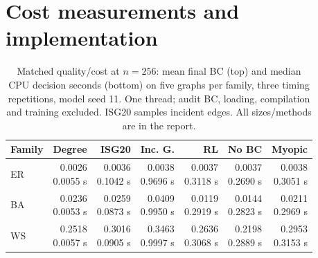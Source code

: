 \documentclass[11pt]{article}
\begin{document}
\section{Cost measurements and implementation}
\begin{table}[H]
\centering
\caption{Matched quality/cost at $n=256$: mean final BC (top) and median CPU decision seconds (bottom) on five graphs per family, three timing repetitions, model seed 11. One thread; audit BC, loading, compilation and training excluded. ISG20 samples incident edges. All sizes/methods are in the report.}
\label{tab:timing}
\small
\setlength{\tabcolsep}{3pt}
\begin{tabular}{lrrrrrr}
\toprule
Family & Degree & ISG20 & Inc. G. & RL & No BC & Myopic \\
\midrule
ER & \shortstack[r]{0.0026\\{\scriptsize 0.0055 s}} & \shortstack[r]{0.0036\\{\scriptsize 0.1042 s}} & \shortstack[r]{0.0038\\{\scriptsize 0.9696 s}} & \shortstack[r]{0.0037\\{\scriptsize 0.3118 s}} & \shortstack[r]{0.0037\\{\scriptsize 0.2690 s}} & \shortstack[r]{0.0038\\{\scriptsize 0.3051 s}} \\
BA & \shortstack[r]{0.0236\\{\scriptsize 0.0053 s}} & \shortstack[r]{0.0259\\{\scriptsize 0.0873 s}} & \shortstack[r]{0.0409\\{\scriptsize 0.9950 s}} & \shortstack[r]{0.0119\\{\scriptsize 0.2919 s}} & \shortstack[r]{0.0144\\{\scriptsize 0.2823 s}} & \shortstack[r]{0.0211\\{\scriptsize 0.2969 s}} \\
WS & \shortstack[r]{0.2518\\{\scriptsize 0.0057 s}} & \shortstack[r]{0.3016\\{\scriptsize 0.0905 s}} & \shortstack[r]{0.3463\\{\scriptsize 0.9997 s}} & \shortstack[r]{0.2636\\{\scriptsize 0.3068 s}} & \shortstack[r]{0.2198\\{\scriptsize 0.2889 s}} & \shortstack[r]{0.2953\\{\scriptsize 0.3153 s}} \\
\bottomrule
\end{tabular}
\end{table}
\end{document}
